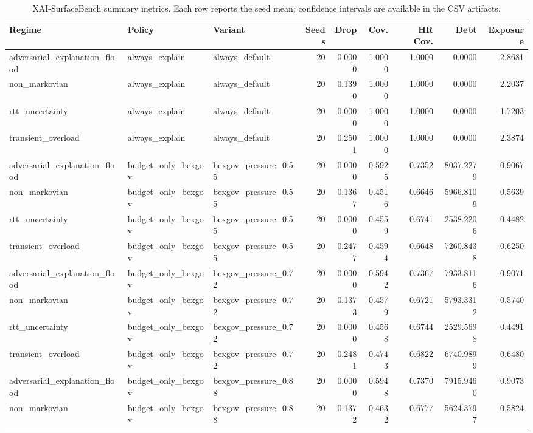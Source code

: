 \begin{table}[t]
\centering
\scriptsize
\caption{XAI-SurfaceBench summary metrics. Each row reports the seed mean; confidence intervals are available in the CSV artifacts.}
\begin{tabular}{lllrrrrrr}
\toprule
Regime & Policy & Variant & Seeds & Drop & Cov. & HR Cov. & Debt & Exposure \\
\midrule
adversarial\_explanation\_flood & always\_explain & always\_default & 20 & 0.0000 & 1.0000 & 1.0000 & 0.0000 & 2.8681 \\
non\_markovian & always\_explain & always\_default & 20 & 0.1390 & 1.0000 & 1.0000 & 0.0000 & 2.2037 \\
rtt\_uncertainty & always\_explain & always\_default & 20 & 0.0000 & 1.0000 & 1.0000 & 0.0000 & 1.7203 \\
transient\_overload & always\_explain & always\_default & 20 & 0.2501 & 1.0000 & 1.0000 & 0.0000 & 2.3874 \\
adversarial\_explanation\_flood & budget\_only\_bexgov & bexgov\_pressure\_0.55 & 20 & 0.0000 & 0.5925 & 0.7352 & 8037.2279 & 0.9067 \\
non\_markovian & budget\_only\_bexgov & bexgov\_pressure\_0.55 & 20 & 0.1367 & 0.4516 & 0.6646 & 5966.8109 & 0.5639 \\
rtt\_uncertainty & budget\_only\_bexgov & bexgov\_pressure\_0.55 & 20 & 0.0000 & 0.4559 & 0.6741 & 2538.2206 & 0.4482 \\
transient\_overload & budget\_only\_bexgov & bexgov\_pressure\_0.55 & 20 & 0.2477 & 0.4594 & 0.6648 & 7260.8438 & 0.6250 \\
adversarial\_explanation\_flood & budget\_only\_bexgov & bexgov\_pressure\_0.72 & 20 & 0.0000 & 0.5942 & 0.7367 & 7933.8116 & 0.9071 \\
non\_markovian & budget\_only\_bexgov & bexgov\_pressure\_0.72 & 20 & 0.1373 & 0.4579 & 0.6721 & 5793.3312 & 0.5740 \\
rtt\_uncertainty & budget\_only\_bexgov & bexgov\_pressure\_0.72 & 20 & 0.0000 & 0.4568 & 0.6744 & 2529.5698 & 0.4491 \\
transient\_overload & budget\_only\_bexgov & bexgov\_pressure\_0.72 & 20 & 0.2481 & 0.4743 & 0.6822 & 6740.9899 & 0.6480 \\
adversarial\_explanation\_flood & budget\_only\_bexgov & bexgov\_pressure\_0.88 & 20 & 0.0000 & 0.5948 & 0.7370 & 7915.9460 & 0.9073 \\
non\_markovian & budget\_only\_bexgov & bexgov\_pressure\_0.88 & 20 & 0.1372 & 0.4632 & 0.6777 & 5624.3797 & 0.5824 \\

\end{tabular}
\end{table}
